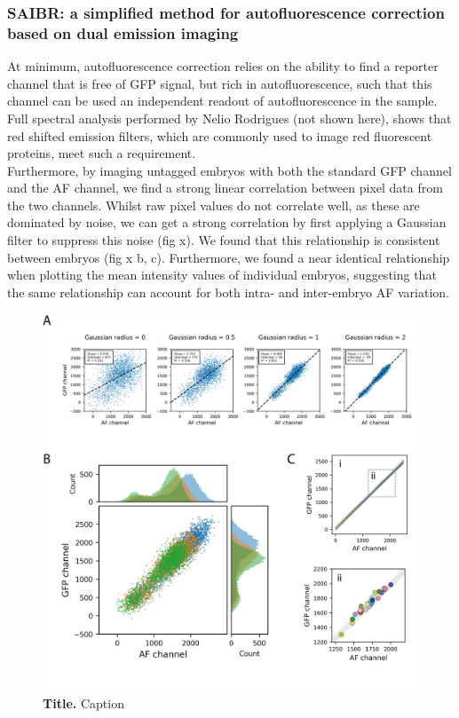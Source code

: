 \documentclass[12pt]{"article"}
\newcommand{\mycaption}[2]{\caption[#1]{\textbf{#1.} #2}}
\begin{document}
\subsubsection{SAIBR: a simplified method for autofluorescence correction based on dual emission imaging}


At minimum, autofluorescence correction relies on the ability to find a reporter channel that is free of GFP signal, but rich in autofluorescence, such that this channel can be used an independent readout of autofluorescence in the sample. Full spectral analysis performed by Nelio Rodrigues (not shown here), shows that red shifted emission filters, which are commonly used to image red fluorescent proteins, meet such a requirement.\\

Furthermore, by imaging untagged embryos with both the standard GFP channel and the AF channel, we find a strong linear correlation between pixel data from the two channels. Whilst raw pixel values do not correlate well, as these are dominated by noise, we can get a strong correlation by first applying a Gaussian filter to suppress this noise (fig x). We found that this relationship is consistent between embryos (fig x b, c). Furthermore, we found a near identical relationship when plotting the mean intensity values of individual embryos, suggesting that the same relationship can account for both intra- and inter-embryo AF variation. \\

\begin{figure}[!h]
\includegraphics[scale=0.95]{saibr_n2_correlation}
\setlength{\abovecaptionskip}{20pt}
\centering
\mycaption{Title}{Caption}
\label{fig:saibr_n2_correlation}
\end{figure}
\end{document}
